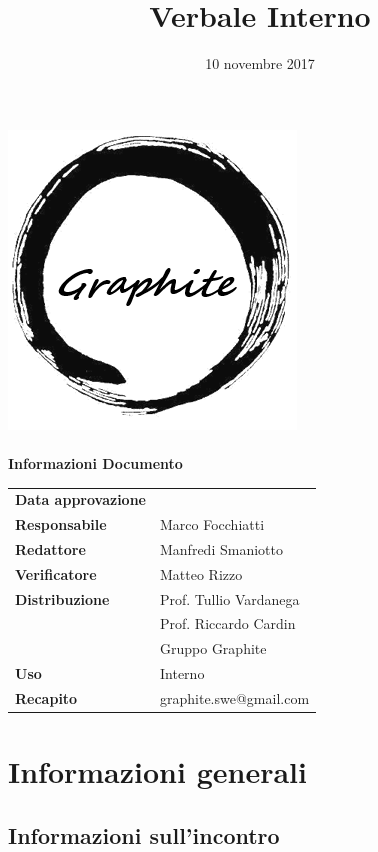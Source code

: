 \documentclass[openany,12pt,a4paper]{article}
\title{Verbale Interno}
\author{}
\date{10 novembre 2017}
\begin{document}
	\makeatletter
	\begin{titlepage}
		\setlength{\headsep}{0pt}  
		\begin{center}
			\includegraphics[width=0.5\linewidth]{Logo.png}\\[1em]
			{\huge \bfseries  \@title }\\[10ex]
			\textbf{\Large Informazioni Documento} \\[2em]
			\bgroup
			\def\arraystretch{1.5}
			\begin{tabular}{l|l}
				\textbf{Data approvazione} & \large \@date \\
				\textbf{Responsabile} & Marco Focchiatti \\
				\textbf{Redattore} & Manfredi Smaniotto \\
				\textbf{Verificatore} & Matteo Rizzo \\
				\textbf{Distribuzione} & Prof. Tullio Vardanega \\
				 & Prof. Riccardo Cardin \\
				 & Gruppo Graphite \\
				\textbf{Uso} & Interno \\
				\textbf{Recapito} & graphite.swe@gmail.com \\
			\end{tabular}
		\egroup
		\end{center}
	\end{titlepage}
	\makeatother

	\thispagestyle{empty}
	\newpage
	
	\tableofcontents
	\newpage
	
	\section{Informazioni generali}
	
	\subsection{Informazioni sull'incontro}
	
\end{document}
